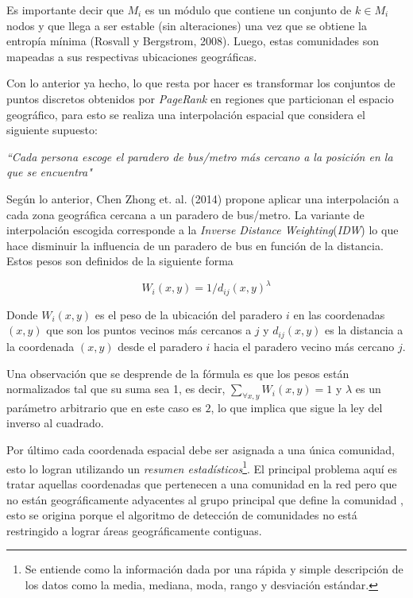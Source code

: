 \documentclass[12pt]{article}
\begin{document}
Es importante decir que $M_i$ es un módulo que contiene un conjunto de $k \in M_i$ nodos y que llega a ser estable (sin alteraciones) una vez que se obtiene la entropía mínima (Rosvall y Bergstrom, 2008). Luego, estas comunidades son mapeadas a sus respectivas ubicaciones geográficas.

Con lo anterior ya hecho, lo que resta por hacer es transformar los conjuntos de puntos discretos obtenidos por \textit{PageRank} en regiones que particionan el espacio geográfico, para esto se realiza una interpolación espacial que considera el siguiente supuesto:

\begin{center}
	\textit{``Cada persona escoge el paradero de bus/metro más cercano a la posición en la que se encuentra"}
\end{center} 

Según lo anterior, Chen Zhong et. al. (2014) propone aplicar una interpolación a cada zona geográfica cercana a un paradero de bus/metro. La variante de interpolación escogida corresponde a la \textit{Inverse Distance Weighting}(\textit{IDW}) lo que hace disminuir la influencia de un paradero de bus en función de la distancia. Estos pesos son definidos de la siguiente forma 

$$
	W_i(x,y) = 1/d_{ij} (x,y)^\lambda
$$

Donde $W_i(x,y)$ es el peso de la ubicación del paradero $i$ en las coordenadas $(x,y)$ que son los puntos vecinos más cercanos a $j$ y $d_{ij} (x,y)$ es la distancia a la coordenada $(x,y)$ desde el paradero $i$ hacia el paradero vecino más cercano $j$.

Una observación que se desprende de la fórmula es que los pesos están normalizados tal que su suma sea 1, es decir, $\sum_{\forall x,y} W_i (x,y)=1$ y $\lambda$ es un parámetro arbitrario que en este caso es $2$, lo que implica que sigue la ley del inverso al cuadrado.

Por último cada coordenada espacial debe ser asignada a una única comunidad, esto lo logran utilizando un  \textit{resumen estadísticos}\footnote{Se entiende como la información dada por una rápida y simple descripción de los datos como la media, mediana, moda, rango y desviación estándar.}. El principal problema aquí es tratar aquellas coordenadas que pertenecen a una comunidad en la red pero que no están geográficamente adyacentes al grupo principal que define la comunidad	, esto se origina porque el algoritmo de detección de comunidades no está restringido a lograr áreas geográficamente contiguas.
\end{document}
